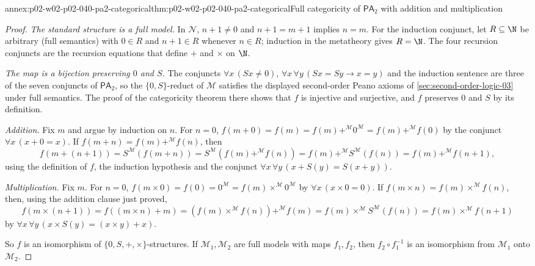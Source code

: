 \begin{annexitem}{annex:p02-w02-p02-040-pa2-categorical}{thm:p02-w02-p02-040-pa2-categorical}{Full categoricity of \(\mathsf{PA}_2\) with addition and multiplication}
\begin{proof}
\emph{The standard structure is a full model.}  In \(\mathcal N\), \(n+1\neq0\)
and \(n+1=m+1\) implies \(n=m\).  For the induction conjunct, let
\(R\subseteq\N\) be arbitrary (full semantics) with \(0\in R\) and
\(n+1\in R\) whenever \(n\in R\); induction in the metatheory gives
\(R=\N\).  The four recursion conjuncts are the recursion equations that
define \(+\) and \(\times\) on \(\N\).

\emph{The map is a bijection preserving \(0\) and \(S\).}  The conjuncts
\(\forall x\,(Sx\neq0)\), \(\forall x\,\forall y\,(Sx=Sy\to x=y)\) and the
induction sentence are three of the seven conjuncts of \(\mathsf{PA}_2\),
so the \(\{0,S\}\)-reduct of \(\mathcal M\) satisfies the displayed
second-order Peano axioms of \cref{sec:second-order-logic-03} under full
semantics.  The proof of the categoricity theorem there shows that \(f\) is
injective and surjective, and \(f\) preserves \(0\) and \(S\) by its
definition.

\emph{Addition.}  Fix \(m\) and argue by induction on \(n\).  For \(n=0\),
\(f(m+0)=f(m)=f(m)+^{\mathcal M}0^{\mathcal M}=f(m)+^{\mathcal M}f(0)\) by
the conjunct \(\forall x\,(x+0=x)\).  If \(f(m+n)=f(m)+^{\mathcal M}f(n)\),
then
\[
 f(m+(n+1))=S^{\mathcal M}(f(m+n))
 =S^{\mathcal M}(f(m)+^{\mathcal M}f(n))
 =f(m)+^{\mathcal M}S^{\mathcal M}(f(n))
 =f(m)+^{\mathcal M}f(n+1),
\]
using the definition of \(f\), the induction hypothesis and the conjunct
\(\forall x\,\forall y\,(x+S(y)=S(x+y))\).

\emph{Multiplication.}  Fix \(m\).  For \(n=0\),
\(f(m\times0)=f(0)=0^{\mathcal M}=f(m)\times^{\mathcal M}0^{\mathcal M}\) by
\(\forall x\,(x\times0=0)\).  If \(f(m\times n)=f(m)\times^{\mathcal M}f(n)\),
then, using the addition clause just proved,
\[
 f(m\times(n+1))=f((m\times n)+m)
 =(f(m)\times^{\mathcal M}f(n))+^{\mathcal M}f(m)
 =f(m)\times^{\mathcal M}S^{\mathcal M}(f(n))
 =f(m)\times^{\mathcal M}f(n+1)
\]
by \(\forall x\,\forall y\,(x\times S(y)=(x\times y)+x)\).

So \(f\) is an isomorphism of \(\{0,S,+,\times\}\)-structures.  If
\(\mathcal M_1,\mathcal M_2\) are full models with maps \(f_1,f_2\), then
\(f_2\circ f_1^{-1}\) is an isomorphism from \(\mathcal M_1\) onto
\(\mathcal M_2\).
\end{proof}
\end{annexitem}

